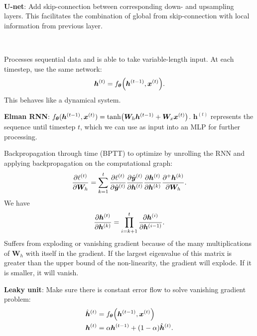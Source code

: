 \documentclass{article}
\newcommand{\lft}{\mathopen{}\mathclose\bgroup\left}
\newcommand{\rgt}{\aftergroup\egroup\right}
\renewcommand{\vec}[1]{\bm{#1}}
\newcommand{\mat}[1]{\bm{#1}}
\newenvironment{topic}[1]
{\textbf{\sffamily \colorbox{black}{\rlap{\textbf{\textcolor{white}{#1}}}\hspace{\linewidth}\hspace{-2\fboxsep}}} \\ \vspace{0.2cm}}
{}
\begin{document}
\begin{multicols*}{2}
\begin{topic}{Fully convolutional neural networks}
        \textbf{U-net}: Add skip-connection between corresponding down- and upsampling layers. This facilitates the
        combination of global from skip-connection with local information from previous layer.

    \end{topic}

    \begin{topic}{Recurrent neural networks}

        Processes sequential data and is able to take variable-length input. At each timestep, use the same
        network: \[
            \vec{h}^{(t)} = f_{\vec{\theta}} \lft( \vec{h}^{(t-1)}, \vec{x}^{(t)} \rgt).
        \]
        This behaves like a dynamical system.

        \textbf{Elman RNN}: $f_{\vec{\theta}}(\vec{h}^{(t-1)}, \vec{x}^{(t)}) = \tanh \lft( \mat{W}_h \vec{h}^{(t-1)} + \mat{W}_x \vec{x}^{(t)} \rgt)$.
        $\vec{h}^{(t)}$ represents the sequence until timestep $t$, which we can use as input into an
        MLP for further processing.

        Backpropagation through time (BPTT) to optimize by unrolling the RNN and applying backpropagation
        on the computational graph: \[
            \pdv{\ell^{(t)}}{\mat{W}_h} = \sum_{k=1}^{t} \pdv{\ell^{(t)}}{\hat{\vec{y}}^{(t)}} \pdv{\hat{\vec{y}}^{(t)}}{\vec{h}^{(t)}} \pdv{\vec{h}^{(t)}}{\vec{h}^{(k)}} \pdv{^+ \vec{h}^{(k)}}{\mat{W}_h}.
        \]
        We have \[
            \pdv{\vec{h}^{(t)}}{\vec{h}^{(k)}} = \prod_{i=k+1}^t \pdv{\vec{h}^{(i)}}{\vec{h}^{(i-1)}}.
        \]
        Suffers from exploding or vanishing gradient because of the many multiplications of $\mat{W}_h$
        with itself in the gradient. If the largest eigenvalue of this matrix is greater than the upper
        bound of the non-linearity, the gradient will explode. If it is smaller, it will vanish.

        \textbf{Leaky unit}: Make sure there is constant error flow to solve vanishing gradient problem:
        \begin{align*}
            \hat{\vec{h}}^{(t)} & = f_{\vec{\theta}}\lft( \vec{h}^{(t-1)}, \vec{x}^{(t)} \rgt) \\
            \vec{h}^{(t)}       & = \alpha \vec{h}^{(t-1)} + (1-\alpha) \hat{\vec{h}}^{(t)}.
        \end{align*}


\end{topic}
\end{multicols*}
\end{document}
